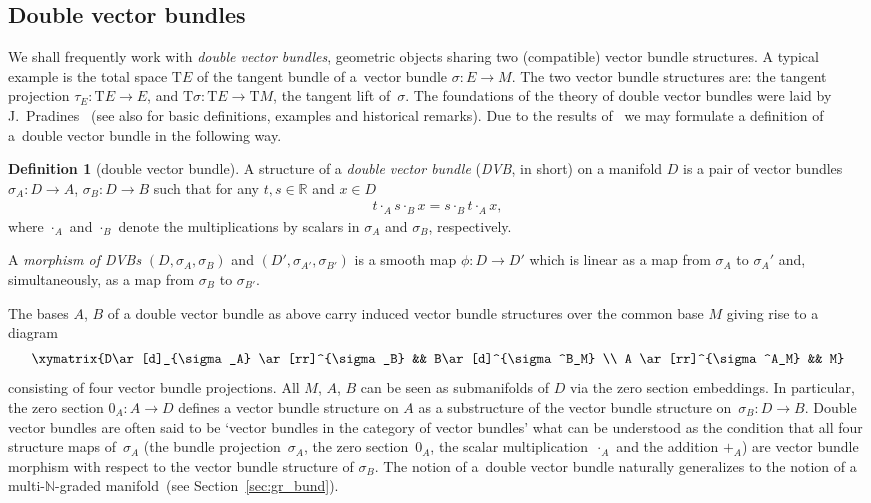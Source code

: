 \documentclass[pdftex]{sigma}
\newcommand{\grB}{{$\N$-graded manifold}}
\newcommand{\R}{\mathbb{R}}
\newcommand{\N}{\mathbb{N}}
\newcommand{\ra}{\rightarrow}
\newcommand{\T}{\mathrm{T}} %
\numberwithin{equation}{section}
\theoremstyle{definition}
\newtheorem{df}[thm]{Definition}
\begin{document}
\subsection{Double vector bundles}
We shall frequently work with \emph{double vector bundles}, geometric objects sharing two (compatible) vector bundle structures. A typical example is the total space $\T E$ of the tangent bundle of a~vector bundle $\sigma\colon E\ra M$. The two vector bundle structures are: the tangent projection $\tau_E\colon \T E\ra E$, and $\T \sigma\colon \T E\ra \T M$, the tangent lift of~$\sigma$. The foundations of the theory of double vector bundles were laid by J.~Pradines~\cite{Pradines1977} (see also \cite[Chapter~9]{Mackenzie_lie_2005} for basic definitions, examples and historical remarks). Due to the results of~\cite{JG_MR_hi_VB_2009} we may formulate a definition of a~double vector bundle in the following way.
\begin{df}[double vector bundle]\label{df:DVB} A structure of a \emph{double vector bundle} (\emph{DVB}, in short) on a manifold $D$ is a pair of vector bundles $\sigma_A\colon D \ra A$, $\sigma_B\colon D \ra B$ such that for any $t, s\in\R$ and $x\in D$
\begin{gather}\label{eqn:DVB}
t\cdot_A s \cdot_B x = s\cdot_B t \cdot_A x,
\end{gather}
where $\cdot_A$ and $\cdot_B$ denote the multiplications by scalars in $\sigma_A$ and $\sigma_B$, respectively.

A \emph{morphism of DVBs} $(D,\sigma_A,\sigma_B)$ and $(D',\sigma_{A'},\sigma_{B'})$ is a smooth map $\phi\colon D\ra D'$ which is linear as a map from $\sigma_A$ to $\sigma_A'$ and, simultaneously, as a map from $\sigma_B$ to $\sigma_{B'}$.
\end{df}
The bases $A$, $B$ of a double vector bundle as above carry induced vector bundle structures over the common base $M$ giving rise to a diagram
\begin{gather*}
\xymatrix{D\ar[d]_{\sigma_A} \ar[rr]^{\sigma_B} && B\ar[d]^{\sigma^B_M} \\
A \ar[rr]^{\sigma^A_M} && M}
\end{gather*}
consisting of four vector bundle projections. All $M$, $A$, $B$ can be seen as submanifolds of $D$ via the zero section embeddings. In particular, the zero section $0_A\colon A\ra D$ defines a vector bundle structure on $A$ as a substructure of the vector bundle structure on~$\sigma_B\colon D\ra B$. Double vector bundles are often said to be `vector bundles in the category of vector bundles' what can be understood as the condition that all four structure maps of~$\sigma_A$ (the bundle projection~$\sigma_A$, the zero section~$0_A$, the scalar multiplication~$\cdot_A$ and the addition $+_A$) are vector bundle morphism with respect to the vector bundle structure of $\sigma_B$. The notion of a~double vector bundle naturally generalizes to the notion of a multi-\grB\ (see Section~\ref{sec:gr_bund}).
\end{document}
